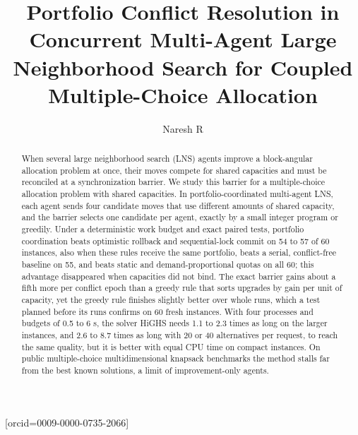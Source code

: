 \documentclass[a4paper,fleqn]{cas-sc}
\begin{document}
\let\WriteBookmarks\relax


\title [mode = title]{Portfolio Conflict Resolution in Concurrent Multi-Agent Large Neighborhood Search for Coupled Multiple-Choice Allocation}

\author[1]{Naresh R}[orcid=0009-0000-0735-2066]
\cormark[1]

\begin{abstract}
When several large neighborhood search (LNS) agents improve a block-angular allocation problem at once, their moves compete for shared capacities and must be reconciled at a synchronization barrier. We study this barrier for a multiple-choice allocation problem with shared capacities. In portfolio-coordinated multi-agent LNS, each agent sends four candidate moves that use different amounts of shared capacity, and the barrier selects one candidate per agent, exactly by a small integer program or greedily. Under a deterministic work budget and exact paired tests, portfolio coordination beats optimistic rollback and sequential-lock commit on 54 to 57 of 60 instances, also when these rules receive the same portfolio, beats a serial, conflict-free baseline on 55, and beats static and demand-proportional quotas on all 60; this advantage disappeared when capacities did not bind. The exact barrier gains about a fifth more per conflict epoch than a greedy rule that sorts upgrades by gain per unit of capacity, yet the greedy rule finishes slightly better over whole runs, which a test planned before its runs confirms on 60 fresh instances. With four processes and budgets of 0.5 to 6 s, the solver HiGHS needs 1.1 to 2.3 times as long on the larger instances, and 2.6 to 8.7 times as long with 20 or 40 alternatives per request, to reach the same quality, but it is better with equal CPU time on compact instances. On public multiple-choice multidimensional knapsack benchmarks the method stalls far from the best known solutions, a limit of improvement-only agents.
\end{abstract}
\end{document}
